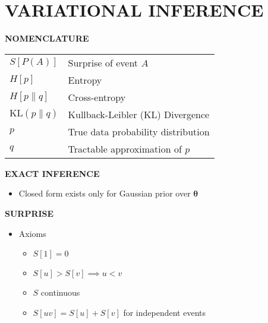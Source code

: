 \section{VARIATIONAL INFERENCE}

\begin{yellowbox}{\textbf{NOMENCLATURE}}
    \begin{tabularx}{\columnwidth}{ll}
        $S[P(A)]$ & Surprise of event $A$\\
        \addlinespace[2pt]
        $H[p]$ & Entropy\\
        \addlinespace[2pt]
        $H[p\| q]$ & Cross-entropy\\
        \addlinespace[2pt]
        $\mathrm{KL}(p\| q)$ & Kullback-Leibler (KL) Divergence\\
        \addlinespace[2pt]
        $p$ & True data probability distribution\\
        \addlinespace[2pt]
        $q$ & Tractable approximation of $p$
    \end{tabularx}
\end{yellowbox}

\begin{whitebox}{\textbf{EXACT INFERENCE}}
    \begin{itemize}
        \item Closed form exists only for Gaussian prior over $\bm{\theta}$
    \end{itemize}
\end{whitebox}

\begin{whitebox}{\textbf{SURPRISE}}
    \begin{itemize}
        \item Axioms
        \begin{itemize}
            \item $S[1]=0$
            \item $S[u]>S[v]\implies u<v$
            \item $S$ continuous
            \item $S[uv]=S[u]+S[v]$ for independent events
        \end{itemize}
    \end{itemize}
\end{whitebox}

